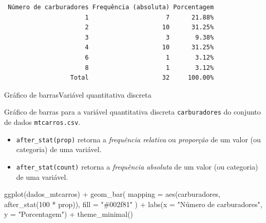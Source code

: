 \documentclass[
  10pt,
  ignorenonframetext,
]{beamer}
\newenvironment{Shaded}{\begin{snugshade}}{\end{snugshade}}
\newcommand{\AttributeTok}[1]{\textcolor[rgb]{0.40,0.45,0.13}{#1}}
\newcommand{\DecValTok}[1]{\textcolor[rgb]{0.68,0.00,0.00}{#1}}
\newcommand{\FunctionTok}[1]{\textcolor[rgb]{0.28,0.35,0.67}{#1}}
\newcommand{\NormalTok}[1]{\textcolor[rgb]{0.00,0.23,0.31}{#1}}
\newcommand{\SpecialCharTok}[1]{\textcolor[rgb]{0.37,0.37,0.37}{#1}}
\newcommand{\StringTok}[1]{\textcolor[rgb]{0.13,0.47,0.30}{#1}}
\providecommand{\tightlist}{%
  \setlength{\itemsep}{0pt}\setlength{\parskip}{0pt}}\usepackage{longtable,booktabs,array}
\begin{document}
\begin{frame}[fragile]
\small

\begin{verbatim}
 Número de carburadores Frequência (absoluta) Porcentagem
                      1                     7      21.88%
                      2                    10      31.25%
                      3                     3       9.38%
                      4                    10      31.25%
                      6                     1       3.12%
                      8                     1       3.12%
                  Total                    32     100.00%
\end{verbatim}

\normalsize
\end{frame}

\begin{frame}[fragile]{Gráfico de barras\newline Variável quantitativa
discreta}
\protect\hypertarget{gruxe1fico-de-barrasvariuxe1vel-quantitativa-discreta}{}
\small

Gráfico de barras para a variável quantitativa discreta
\texttt{carburadores} do conjunto de dados \texttt{mtcarros.csv}.

\begin{itemize}
\tightlist
\item
  \texttt{after\_stat(prop)} retorna a \emph{frequência relativa} ou
  \emph{proporção} de um valor (ou categoria) de uma variável.
\item
  \texttt{after\_stat(count)} retorna a \emph{frequência absoluta} de um
  valor (ou categoria) de uma variável.
\end{itemize}

\begin{Shaded}
\begin{Highlighting}[]
\FunctionTok{ggplot}\NormalTok{(dados\_mtcarros) }\SpecialCharTok{+}
  \FunctionTok{geom\_bar}\NormalTok{(}
    \AttributeTok{mapping =} \FunctionTok{aes}\NormalTok{(carburadores, }\FunctionTok{after\_stat}\NormalTok{(}\DecValTok{100} \SpecialCharTok{*}\NormalTok{ prop)),}
    \AttributeTok{fill =} \StringTok{"\#002f81"}
\NormalTok{  ) }\SpecialCharTok{+}
  \FunctionTok{labs}\NormalTok{(}\AttributeTok{x =} \StringTok{"Número de carburadores"}\NormalTok{, }\AttributeTok{y =} \StringTok{"Porcentagem"}\NormalTok{) }\SpecialCharTok{+}
  \FunctionTok{theme\_minimal}\NormalTok{()}
\end{Highlighting}
\end{Shaded}

\normalsize
\end{frame}
\end{document}
